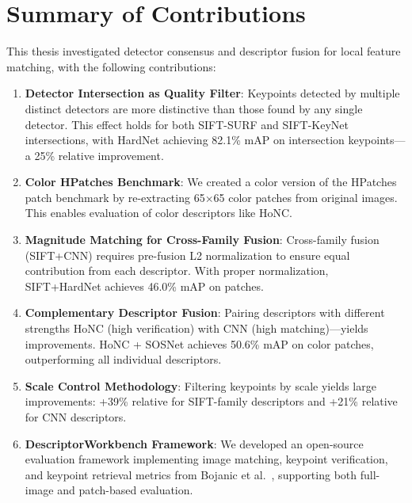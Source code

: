 
\section{Summary of Contributions}

This thesis investigated detector consensus and descriptor fusion for local feature matching, with the following contributions:

\begin{enumerate}
    \item \textbf{Detector Intersection as Quality Filter}: Keypoints detected by multiple distinct detectors are more distinctive than those found by any single detector. This effect holds for both SIFT-SURF and SIFT-KeyNet intersections, with HardNet achieving 82.1\% mAP on intersection keypoints---a 25\% relative improvement.

    \item \textbf{Color HPatches Benchmark}: We created a color version of the HPatches patch benchmark by re-extracting 65$\times$65 color patches from original images. This enables evaluation of color descriptors like HoNC.

    \item \textbf{Magnitude Matching for Cross-Family Fusion}: Cross-family fusion (SIFT+CNN) requires pre-fusion L2 normalization to ensure equal contribution from each descriptor. With proper normalization, SIFT+HardNet achieves 46.0\% mAP on patches.

    \item \textbf{Complementary Descriptor Fusion}: Pairing descriptors with different strengths HoNC (high verification) with CNN (high matching)---yields improvements. HoNC + SOSNet achieves 50.6\% mAP on color patches, outperforming all individual descriptors.

    \item \textbf{Scale Control Methodology}: Filtering keypoints by scale yields large improvements: +39\% relative for SIFT-family descriptors and +21\% relative for CNN descriptors.

    \item \textbf{DescriptorWorkbench Framework}: We developed an open-source evaluation framework implementing image matching, keypoint verification, and keypoint retrieval metrics from Bojanic et al.~\cite{bojanic2020comparison}, supporting both full-image and patch-based evaluation.
\end{enumerate}

